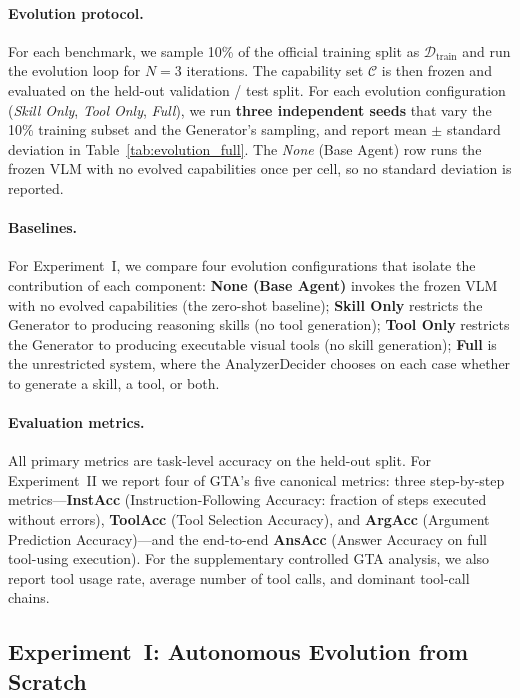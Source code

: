 \paragraph{Evolution protocol.}
For each benchmark, we sample 10\% of the official training split as
$\mathcal{D}_{\text{train}}$ and run the \sysname{} evolution loop for $N{=}3$ iterations.
The capability set $\mathcal{C}$ is then frozen and evaluated on the held-out
validation / test split. For each evolution configuration (\emph{Skill Only},
\emph{Tool Only}, \emph{Full}), we run \textbf{three independent seeds} that vary the
10\% training subset and the Generator's sampling, and report mean $\pm$ standard
deviation in Table~\ref{tab:evolution_full}. The \emph{None} (Base Agent) row runs the
frozen VLM with no evolved capabilities once per cell, so no standard deviation is
reported.

\paragraph{Baselines.}
For Experiment~I, we compare four evolution configurations that isolate the contribution
of each component:
\textbf{None (Base Agent)} invokes the frozen VLM with no evolved capabilities (the
zero-shot baseline);
\textbf{Skill Only} restricts the Generator to producing reasoning skills (no tool
generation);
\textbf{Tool Only} restricts the Generator to producing executable visual tools (no skill
generation);
\textbf{Full} is the unrestricted \sysname{} system, where the AnalyzerDecider chooses on
each case whether to generate a skill, a tool, or both.

\paragraph{Evaluation metrics.}
All primary metrics are task-level accuracy on the held-out split.
For Experiment~II we report four of GTA's five canonical metrics: three
step-by-step metrics---\textbf{InstAcc} (Instruction-Following Accuracy: fraction of
steps executed without errors), \textbf{ToolAcc} (Tool Selection Accuracy), and
\textbf{ArgAcc} (Argument Prediction Accuracy)---and the end-to-end \textbf{AnsAcc}
(Answer Accuracy on full tool-using execution). 
For the supplementary controlled GTA analysis, we also report tool usage rate, average
number of tool calls, and dominant tool-call chains.

\subsection{Experiment~I: Autonomous Evolution from Scratch}
\label{sec:exp1}

